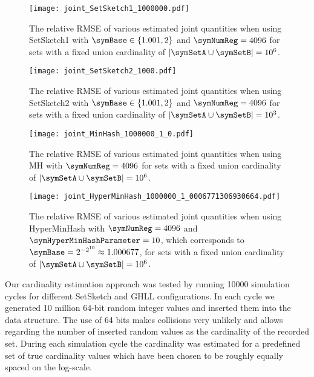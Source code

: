\documentclass[sigconf, nonacm]{acmart}
\begin{document}
\begin{figure*}
\centering
\texttt{[image: joint\_SetSketch1\_1000000.pdf]}
\caption{\boldmath The relative \acs*{RMSE} of various estimated joint quantities when using SetSketch1 with $\symBase\in\lbrace1.001, 2\rbrace$ and $\symNumReg=4096$ for sets with a fixed union cardinality of $|\symSetA\cup\symSetB|=10^6$.}
\label{fig:joint_setsketch1}
\end{figure*}

\begin{figure*}
\centering
\texttt{[image: joint\_SetSketch2\_1000.pdf]}
\caption{\boldmath The relative \acs*{RMSE} of various estimated joint quantities when using SetSketch2 with $\symBase\in\lbrace1.001, 2\rbrace$ and $\symNumReg=4096$ for sets with a fixed union cardinality of $|\symSetA\cup\symSetB|=10^3$.}
\label{fig:joint_setsketch2}
\end{figure*}

\begin{figure*}
\centering
\texttt{[image: joint\_MinHash\_1000000\_1\_0.pdf]}
\caption{\boldmath The relative \acs*{RMSE} of various estimated joint quantities when using \acs*{MH} with $\symNumReg=4096$ for sets with a fixed union cardinality of $|\symSetA\cup\symSetB|=10^6$.}
\label{fig:joint_minhash}
\end{figure*}

\begin{figure*}
\centering
\texttt{[image: joint\_HyperMinHash\_1000000\_1\_0006771306930664.pdf]}
\caption{\boldmath The relative \acs*{RMSE} of various estimated joint quantities when using HyperMinHash with $\symNumReg=4096$ and $\symHyperMinHashParameter=10$, which corresponds to $\symBase=2^{-2^{10}}\approx 1.000677$, for sets with a fixed union cardinality of $|\symSetA\cup\symSetB|=10^6$.}
\label{fig:joint_hyperminhash}
\end{figure*}

Our cardinality estimation approach was tested by running \num{10000} simulation cycles for different SetSketch and \ac{GHLL} configurations. In each cycle we generated 10 million 64-bit random integer values and inserted them into the data structure. The use of 64 bits makes collisions very unlikely and allows regarding the number of inserted random values as the cardinality of the recorded set. During each simulation cycle the cardinality was estimated for a predefined set of true cardinality values which have been chosen to be roughly equally spaced on the log-scale.
\end{document}
